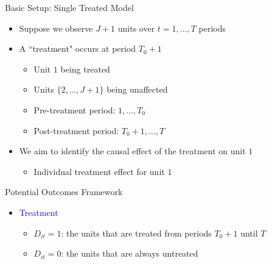 \documentclass[dvipsnames,hyperref={pdfpagelabels=false}]{beamer}
\begin{document}
\begin{frame}{Basic Setup: Single Treated Model}
\begin{itemize}
\item Suppose we observe $J+1$ units over $t=1,...,T$ periods
\vspace{0.2cm}
\item A ``treatment" occurs at period $T_0+1$
\vspace{0.2cm}
\begin{itemize}	
\item Unit $1$ being treated
\vspace{0.2cm}
\item Units $\{2,...,J+1\}$ being unaffected 
\vspace{0.2cm}
\item Pre-treatment period: $1,\ldots,T_0$	
\vspace{0.2cm}	
\item Post-treatment period: $T_0+1,\ldots,T$	
\vspace{0.2cm} 
\end{itemize}

\item We aim to identify the causal effect of the treatment on unit $1$

\vspace{0.2cm} 
\begin{itemize}
\item Individual treatment effect for unit $1$
\end{itemize}
\end{itemize}

\end{frame}


\begin{frame}{Potential Outcomes Framework}{}
	\begin{itemize}
		
		\item \textcolor{blue}{Treatment}
		\begin{itemize}
			\vspace{0.2cm}
			\item $D_{it}=1$: the units that are treated from periods $T_0+1$ until $T$
			\vspace{0.2cm}
			\item $D_{it}=0$: the units that are always untreated
		\end{itemize}
		
	\end{itemize}
\end{frame}
\end{document}
